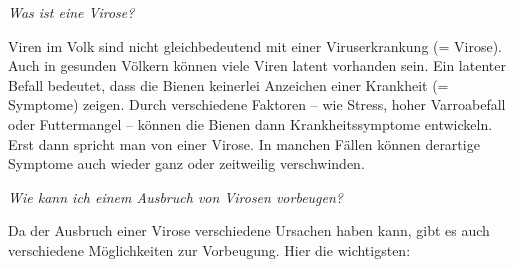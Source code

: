 \textit{Was ist eine Virose?}

Viren im Volk sind nicht gleichbedeutend mit einer Viruserkrankung (= Virose). Auch in gesunden Völkern können viele Viren latent vorhanden sein. Ein latenter Befall bedeutet, dass die Bienen keinerlei Anzeichen einer Krankheit (= Symptome) zeigen. Durch verschiedene Faktoren – wie Stress, hoher Varroabefall oder Futtermangel – können die Bienen dann Krankheitssymptome entwickeln. Erst dann spricht man von einer Virose. In manchen Fällen können derartige Symptome auch wieder ganz oder zeitweilig verschwinden.

\textit{Wie kann ich einem Ausbruch von Virosen vorbeugen?}

Da der Ausbruch einer Virose verschiedene Ursachen haben kann, gibt es auch verschiedene Möglichkeiten zur Vorbeugung. Hier die wichtigsten:

